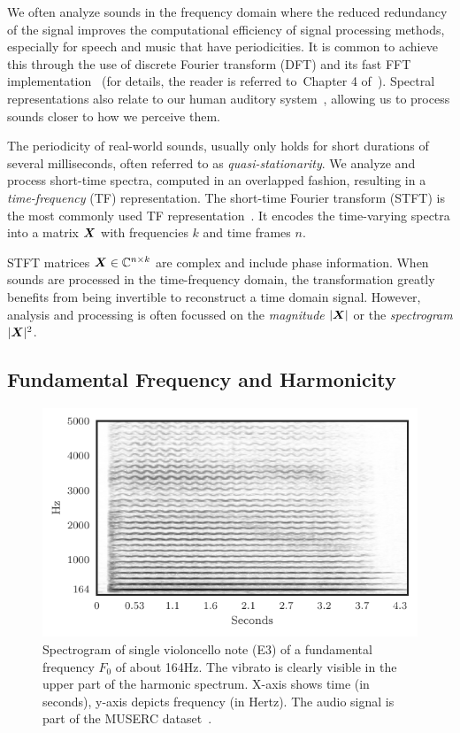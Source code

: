 We often analyze sounds in the frequency domain where the reduced redundancy of the signal improves the computational efficiency of signal processing methods, especially for speech and music that have periodicities.
It is common to achieve this through the use of discrete Fourier transform (DFT) and its fast FFT implementation~\cite{cooley65} (for details, the reader is referred to~Chapter 4 of~\cite{proakis96}).
Spectral representations also relate to our human auditory system~\cite{zwicker13, moore89}, allowing us to process sounds closer to how we perceive them.
\par
The periodicity of real-world sounds, usually only holds for short durations of several milliseconds, often referred to as \emph{quasi-stationarity}.
We analyze and process short-time spectra, computed in an overlapped fashion, resulting in a \emph{time-frequency} (TF) representation.
The short-time Fourier transform (STFT) is the most commonly used TF representation~\cite{mcaulay86}.
It encodes the time-varying spectra into a matrix \({\bm{X}}\) with frequencies \(k\) and time frames \(n\).
\par
STFT matrices \({\bm{X}} \in {\mathbb{C}}^{n \times k}\) are complex and include phase information.
When sounds are processed in the time-frequency domain, the transformation greatly benefits from being invertible to reconstruct a time domain signal.
However, analysis and processing is often focussed  on the \emph{magnitude} \(|{\bm{X}}|\) or the \emph{spectrogram} \(|{\bm{X}}|^2\).

\subsection{Fundamental Frequency and Harmonicity}

\begin{figure}[h!]
  \centering
  \includegraphics[width=0.8\columnwidth]{gfx/cello.pdf}
  \caption{Spectrogram of single violoncello note (E3) of a fundamental frequency \(F_0\) of about 164\si{\hertz}. The vibrato is clearly visible in the upper part of the harmonic spectrum. X-axis shows time (in seconds), y-axis depicts frequency (in Hertz). The audio signal is part of the MUSERC dataset~\cite{stoeter15acm}.}%
  \label{fig:cello_example}%
\end{figure}

